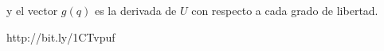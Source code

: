 \begin{multicols*}{3}
        y el vector $g(q)$ es la derivada de $U$ con respecto a cada grado de libertad.

        \begin{center}
        \end{center}

        http://bit.ly/1CTvpuf

\end{multicols*}

